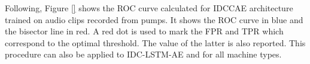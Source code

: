 Following, Figure \ref{} shows the ROC curve calculated for IDCCAE architecture trained on audio clips recorded from pumps. It shows the ROC curve in blue and the bisector line in red. A red dot is used to mark the FPR and TPR which correspond to the optimal threshold. The value of the latter is also reported. 
This procedure can also be applied to IDC-LSTM-AE and for all machine types. \\